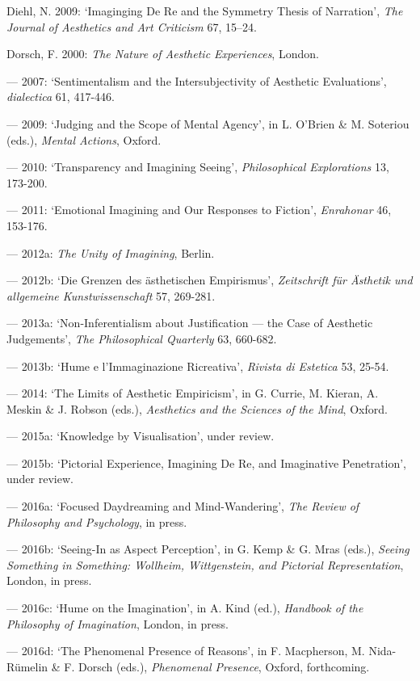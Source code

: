 \begin{hangparas}{.5cm}{1}
Diehl, N. 2009: `Imaginging De Re and the Symmetry Thesis of Narration', \emph{The Journal of Aesthetics and Art Criticism} 67, 15--24.

Dorsch, F. 2000: \emph{The Nature of Aesthetic Experiences}, London.
 
--- 2007: `Sentimentalism and the Intersubjectivity of Aesthetic Evaluations', \emph{dialectica} 61, 417-446. 
 
--- 2009: `Judging and the Scope of Mental Agency', in L. O'Brien \& M. Soteriou (eds.), \emph{Mental Actions}, Oxford. 
 
--- 2010: `Transparency and Imagining Seeing', \emph{Philosophical Explorations} 13, 173-200. 
 
--- 2011: `Emotional Imagining and Our Responses to Fiction', \emph{Enrahonar} 46, 153-176. 
 
--- 2012a: \emph{The Unity of Imagining}, Berlin.

--- 2012b: `Die Grenzen des \"asthetischen Empirismus', \emph{Zeitschrift f\"ur \"Asthetik und allgemeine Kunstwissenschaft} 57, 269-281.
 
--- 2013a: `Non-Inferentialism about Justification --- the Case of Aesthetic Judgements', \emph{The Philosophical Quarterly} 63, 660-682.

--- 2013b: `Hume e l'Immaginazione Ricreativa', \emph{Rivista di Estetica} 53, 25-54. 

--- 2014: `The Limits of Aesthetic Empiricism', in G. Currie, M. Kieran, A. Meskin \& J. Robson (eds.), \emph{Aesthetics and the Sciences of the Mind}, Oxford. 

--- 2015a: `Knowledge by Visualisation', under review.

--- 2015b: `Pictorial Experience, Imagining De Re, and Imaginative Penetration', under review.

--- 2016a: `Focused Daydreaming and Mind-Wandering', \emph{The Review of Philosophy and Psychology}, in press.
 
--- 2016b: `Seeing-In as Aspect Perception', in G. Kemp \& G. Mras (eds.), \emph{Seeing Something in Something: Wollheim, Wittgenstein, and Pictorial Representation}, London, in press.

--- 2016c: `Hume on the Imagination', in A. Kind (ed.), \emph{Handbook of the Philosophy of Imagination}, London, in press.
 
--- 2016d: `The Phenomenal Presence of Reasons', in F. Macpherson, M. Nida-R\"umelin \& F. Dorsch (eds.), \emph{Phenomenal Presence}, Oxford, forthcoming. 
 

\end{hangparas}
